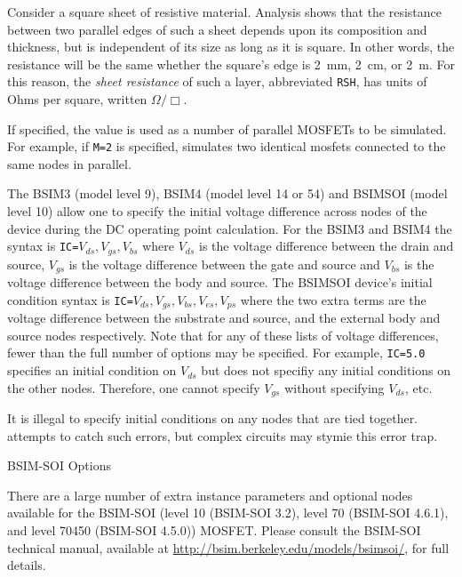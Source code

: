 \begin{Device}
\begin{Parameters}
Consider a square sheet of resistive material. Analysis shows that the
resistance between two parallel edges of such a sheet depends upon its
composition and thickness, but is independent of its size as long as it is
square. In other words, the resistance will be the same whether the square's
edge is 2~mm, 2~cm, or 2~m. For this reason, the \emph{sheet resistance} of
such a layer, abbreviated \texttt{RSH}, has units of Ohms per square,
written $\mathsf{\Omega}/\Box$.


If specified, the value is used as a number of parallel MOSFETs to be
simulated.  For example, if \texttt{M=2} is specified, \Xyce{} simulates two
identical mosfets connected to the same nodes in parallel.


The BSIM3 (model level 9), BSIM4 (model level 14 or 54) and BSIMSOI (model
level 10) allow one to specify the initial voltage difference across
nodes of the device during the DC operating point calculation.  For the
BSIM3 and BSIM4 the syntax is \texttt{IC=$V_{ds}, V_{gs}, V_{bs}$}
where $V_{ds}$ is the voltage difference between the drain and source,
$V_{gs}$ is the voltage difference between the gate and source and
$V_{bs}$ is the voltage difference between the body and source.  The
BSIMSOI device's initial condition syntax is \texttt{IC=$V_{ds},
  V_{gs}, V_{bs}, V_{es}, V_{ps}$} where the two extra terms are the
voltage difference between the substrate and source, and the external
body and source nodes respectively.  Note that for any of these lists of
voltage differences, fewer than the full number of options may be
specified.  For example, \texttt{IC=5.0} specifies an initial condition on $V_{ds}$
but does not specifiy any initial conditions on the other nodes.
Therefore, one cannot specify $V_{gs}$ without specifying $V_{ds}$, etc.

It is illegal to specify initial conditions on any nodes that are tied
together.  \Xyce{} attempts to catch such errors, but complex circuits may
stymie this error trap.

\end{Parameters}

\vbox{\hrulefill}
\item[BSIM-SOI Options]

There are a large number of extra instance parameters and optional
nodes available for the BSIM-SOI (level 10 (BSIM-SOI 3.2), level 70
(BSIM-SOI 4.6.1), and level 70450 (BSIM-SOI 4.5.0)) MOSFET.  Please
consult the BSIM-SOI technical manual, available at
\url{http://bsim.berkeley.edu/models/bsimsoi/}, for full details.


\end{Device}

